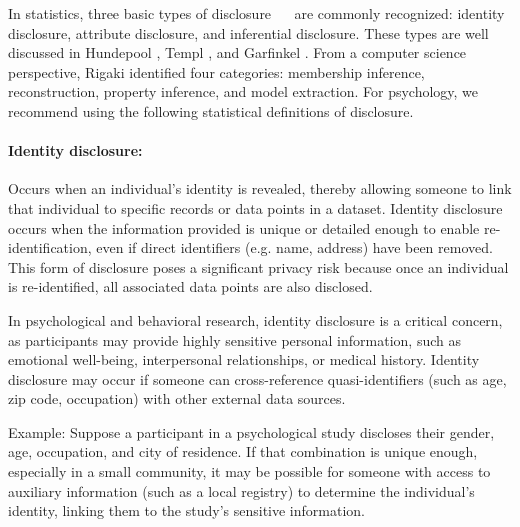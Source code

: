 \documentclass{article}
\begin{document}

In statistics, three basic types of disclosure \cite{1993_Lambert}~\cite{1989_Duncan}~\cite{1977_Dalenius} are commonly recognized: identity disclosure, attribute disclosure, and inferential disclosure. These types are well discussed in Hundepool \cite{2012_Hundepool}, Templ \cite{2017_Templ}, and Garfinkel \cite{2023_NIST}. From a computer science perspective, Rigaki \cite{2024_Rigaki} identified four categories: membership inference, reconstruction, property inference, and model extraction. For psychology, we recommend using the following statistical definitions of disclosure.

\paragraph{Identity disclosure:} 
Occurs when an individual’s identity is revealed, thereby allowing someone to link that individual to specific records or data points in a dataset. Identity disclosure occurs when the information provided is unique or detailed enough to enable re-identification, even if direct identifiers (e.g. name, address) have been removed. This form of disclosure poses a significant privacy risk because once an individual is re-identified, all associated data points are also disclosed.

In psychological and behavioral research, identity disclosure is a critical concern, as participants may provide highly sensitive personal information, such as emotional well-being, interpersonal relationships, or medical history. Identity disclosure may occur if someone can cross-reference quasi-identifiers (such as age, zip code, occupation) with other external data sources.

Example:
Suppose a participant in a psychological study discloses their gender, age, occupation, and city of residence. If that combination is unique enough, especially in a small community, it may be possible for someone with access to auxiliary information (such as a local registry) to determine the individual’s identity, linking them to the study’s sensitive information.

\end{document}
